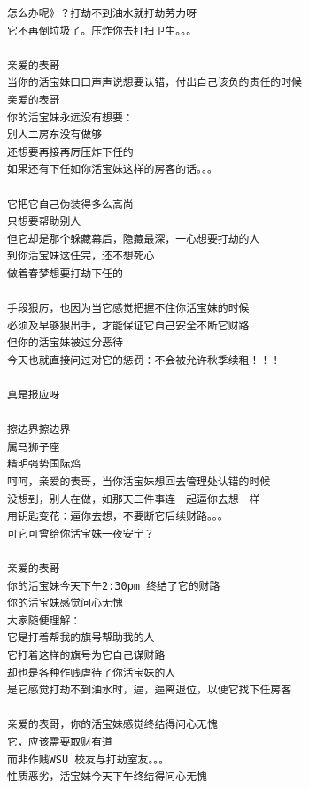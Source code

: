 \documentclass[9pt, b5paper]{article}
\begin{document}
\begin{verbatim}
怎么办呢》？打劫不到油水就打劫劳力呀
它不再倒垃圾了。压炸你去打扫卫生。。。

亲爱的表哥
当你的活宝妹口口声声说想要认错，付出自己该负的责任的时候
亲爱的表哥
你的活宝妹永远没有想要：
别人二房东没有做够
还想要再接再厉压炸下任的
如果还有下任如你活宝妹这样的房客的话。。。

它把它自己伪装得多么高尚
只想要帮助别人
但它却是那个躲藏幕后，隐藏最深，一心想要打劫的人
到你活宝妹这任完，还不想死心
做着春梦想要打劫下任的

手段狠厉，也因为当它感觉把握不住你活宝妹的时候
必须及早够狠出手，才能保证它自己安全不断它财路
但你的活宝妹被过分恶待
今天也就直接问过对它的惩罚：不会被允许秋季续租！！！

真是报应呀

擦边界擦边界
属马狮子座
精明强势国际鸡
呵呵，亲爱的表哥，当你活宝妹想回去管理处认错的时候
没想到，别人在做，如那天三件事连一起逼你去想一样
用钥匙变花：逼你去想，不要断它后续财路。。。
可它可曾给你活宝妹一夜安宁？

亲爱的表哥
你的活宝妹今天下午2:30pm 终结了它的财路
你的活宝妹感觉问心无愧
大家随便理解：
它是打着帮我的旗号帮助我的人
它打着这样的旗号为它自己谋财路
却也是各种作贱虐待了你活宝妹的人
是它感觉打劫不到油水时，逼，逼离退位，以便它找下任房客

亲爱的表哥，你的活宝妹感觉终结得问心无愧
它，应该需要取财有道
而非作贱WSU 校友与打劫室友。。。
性质恶劣，活宝妹今天下午终结得问心无愧
\end{verbatim}
\end{document}
